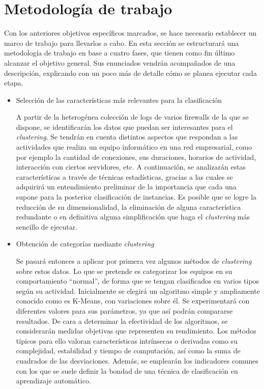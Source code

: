 \section{Metodología de trabajo}\label{sec:metodologiatrabajo}

Con los anteriores objetivos específicos marcados, se hace necesario establecer un marco de trabajo para llevarlos a cabo.
En esta sección se estructurará una metodología de trabajo en base a cuatro fases, que tienen como fin último alcanzar el objetivo general.
Sus enunciados vendrán acompañados de una descripción, explicando con un poco más de detalle cómo se planea ejecutar cada etapa.

\begin{itemize}

    \item Selección de las características más relevantes para la clasificación

A partir de la heterogénea colección de logs de varios firewalls de la que se dispone, se identificarán los datos que puedan ser interesantes para el \emph{clustering}.
Se tendrán en cuenta distintos aspectos que respondan a las actividades que realiza un equipo informático en una red empresarial, como por ejemplo la cantidad de conexiones, sus duraciones, horarios de actividad, interacción con ciertos servidores, etc.
A continuación, se analizarán estas características a través de técnicas estadísticas, gracias a las cuales se adquirirá un entendimiento preliminar de la importancia que cada una supone para la posterior clasificación de instancias.
Es posible que se logre la reducción de su dimensionalidad, la eliminación de alguna característica redundante o en definitiva alguna simplificación que haga el \emph{clustering} más sencillo de ejecutar.

    \item Obtención de categorías mediante \emph{clustering}

Se pasará entonces a aplicar por primera vez algunos métodos de \emph{clustering} sobre estos datos.
Lo que se pretende es categorizar los equipos en su comportamiento ``normal'', de forma que se tengan clasificados en varios tipos según su actividad.
Inicialmente se elegirá un algoritmo simple y ampliamente conocido como es K-Means, con variaciones sobre él.
Se experimentará con diferentes valores para sus parámetros, ya que así podrán compararse resultados.
De cara a determinar la efectividad de los algoritmos, se considerarán medidas objetivas que representen su rendimiento.
Los métodos típicos para ello valoran características intrínsecas o derivadas como su complejidad, estabilidad y tiempo de computación, así como la suma de cuadrados de las desviaciones.
Además, se emplearán los indicadores comunes con los que se suele definir la bondad de una técnica de clasificación en aprendizaje automático.


\end{itemize}
